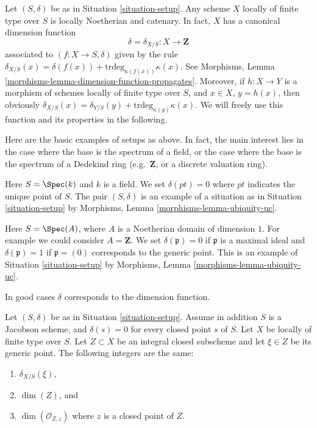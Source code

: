 \medskip\noindent
Let $(S, \delta)$ be as in Situation \ref{situation-setup}.
Any scheme $X$ locally of finite type over $S$ is locally Noetherian
and catenary. In fact, $X$ has a canonical dimension function
$$
\delta = \delta_{X/S} : X \longrightarrow \mathbf{Z}
$$
associated to $(f : X \to S, \delta)$ given by the rule
$\delta_{X/S}(x) = \delta(f(x)) + \text{trdeg}_{\kappa(f(x))}\kappa(x)$.
See Morphisms, Lemma \ref{morphisms-lemma-dimension-function-propagates}.
Moreover, if $h : X \to Y$ is a morphism of schemes locally of finite
type over $S$, and $x \in X$, $y = h(x)$,
then obviously
$\delta_{X/S}(x) = \delta_{Y/S}(y) + \text{trdeg}_{\kappa(y)}\kappa(x)$.
We will freely use this function and its properties in the following.

\medskip\noindent
Here are the basic examples of setups as above.
In fact, the main interest lies in the case where the base
is the spectrum of a field, or the case where the base
is the spectrum of a Dedekind ring (e.g.\ $\mathbf{Z}$,
or a discrete valuation ring).

\begin{example}
\label{example-field}
Here $S = \Spec(k)$ and $k$ is a field.
We set $\delta(pt) = 0$ where $pt$ indicates the unique point of $S$.
The pair $(S, \delta)$ is an example of a situation as in
Situation \ref{situation-setup} by
Morphisms, Lemma \ref{morphisms-lemma-ubiquity-uc}.
\end{example}

\begin{example}
\label{example-domain-dimension-1}
Here $S = \Spec(A)$, where $A$ is a Noetherian domain
of dimension $1$.
For example we could consider $A = \mathbf{Z}$.
We set $\delta(\mathfrak p) = 0$ if
$\mathfrak p$ is a maximal ideal and $\delta(\mathfrak p) = 1$
if $\mathfrak p = (0)$ corresponds to the generic point.
This is an example of Situation \ref{situation-setup} by
Morphisms, Lemma \ref{morphisms-lemma-ubiquity-uc}.
\end{example}

\noindent
In good cases $\delta$ corresponds to the dimension function.

\begin{lemma}
\label{lemma-delta-is-dimension}
Let $(S, \delta)$ be as in Situation \ref{situation-setup}.
Assume in addition $S$ is a Jacobson scheme, and $\delta(s) = 0$ for every
closed point $s$ of $S$. Let $X$ be locally of finite type over $S$.
Let $Z \subset X$ be an integral closed subscheme and let
$\xi \in Z$ be its generic point. The following integers are the same:
\begin{enumerate}
\item $\delta_{X/S}(\xi)$,
\item $\dim(Z)$, and
\item $\dim(\mathcal{O}_{Z, z})$ where $z$ is a closed point of $Z$.
\end{enumerate}
\end{lemma}


